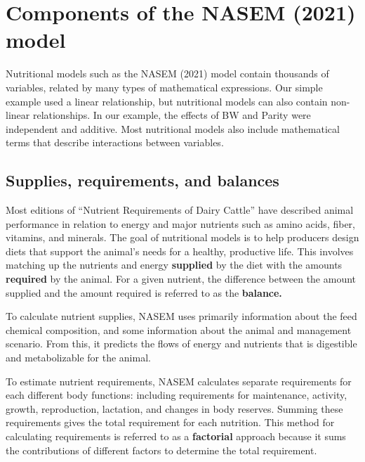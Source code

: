 \documentclass[
]{book}
\begin{document}
\hypertarget{components-of-the-nasem-2021-model}{%
\section{Components of the NASEM (2021) model}\label{components-of-the-nasem-2021-model}}

Nutritional models such as the NASEM (2021) model contain thousands of variables, related by many types of mathematical expressions. Our simple example used a linear relationship, but nutritional models can also contain non-linear relationships. In our example, the effects of BW and Parity were independent and additive. Most nutritional models also include mathematical terms that describe interactions between variables.

\hypertarget{supplies-requirements-and-balances}{%
\subsection{Supplies, requirements, and balances}\label{supplies-requirements-and-balances}}

Most editions of ``Nutrient Requirements of Dairy Cattle'' have described animal performance in relation to energy and major nutrients such as amino acids, fiber, vitamins, and minerals. The goal of nutritional models is to help producers design diets that support the animal's needs for a healthy, productive life. This involves matching up the nutrients and energy \textbf{supplied} by the diet with the amounts \textbf{required} by the animal. For a given nutrient, the difference between the amount supplied and the amount required is referred to as the \textbf{balance.}

To calculate nutrient supplies, NASEM \citeyearpar{NASEM8} uses primarily information about the feed chemical composition, and some information about the animal and management scenario. From this, it predicts the flows of energy and nutrients that is digestible and metabolizable for the animal.

To estimate nutrient requirements, NASEM \citeyearpar{NASEM8} calculates separate requirements for each different body functions: including requirements for maintenance, activity, growth, reproduction, lactation, and changes in body reserves. Summing these requirements gives the total requirement for each nutrition. This method for calculating requirements is referred to as a \textbf{factorial} approach because it sums the contributions of different factors to determine the total requirement.
\end{document}
